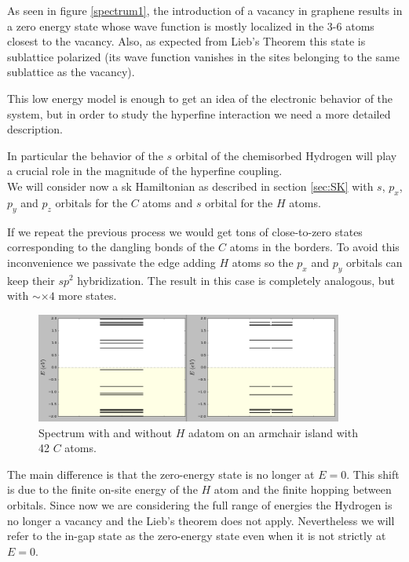 As seen in figure \ref{spectrum1}, the introduction of a vacancy in graphene results in a zero energy state whose wave function is mostly localized in the 3-6 atoms closest to the vacancy. Also, as expected from Lieb's Theorem this state is sublattice polarized (its wave function vanishes in the sites belonging to the same sublattice as the vacancy).

This low energy model is enough to get an idea of the electronic behavior of the system, but in order to study the hyperfine interaction we need a more detailed description.

In particular the behavior of the $s$ orbital of the chemisorbed Hydrogen will play a crucial role in the magnitude of the hyperfine coupling.\\

We will consider now a \ac{sk} Hamiltonian as described in section \ref{sec:SK} with $s$, $p_x$, $p_y$ and $p_z$ orbitals for the $C$ atoms and $s$ orbital for the $H$ atoms.

If we repeat the previous process we would get tons of close-to-zero states corresponding to the dangling bonds of the $C$ atoms in the borders. To avoid this inconvenience we passivate the edge adding $H$ atoms so the $p_x$ and $p_y$ orbitals can keep their $sp^2$ hybridization. The result in this case is completely analogous, but with $\sim\times4$ more states.\\

\begin{figure}[h!]
\centering
\includegraphics[width=0.9\textwidth]{chapter05/figures/spectrum4orb.png}
\vspace{-5pt}
\caption{Spectrum with and without $H$ adatom on an armchair island with 42 $C$ atoms.}
\label{spectrum4}
\end{figure}
\FloatBarrier

The main difference is that the zero-energy state is no longer at $E=0$. This shift is due to the finite on-site energy of the $H$ atom and the finite hopping between orbitals. Since now we are considering the full range of energies the Hydrogen is no longer a vacancy and the Lieb's theorem does not apply. Nevertheless we will refer to the in-gap state as the zero-energy state even when it is not strictly  at $E=0$.

